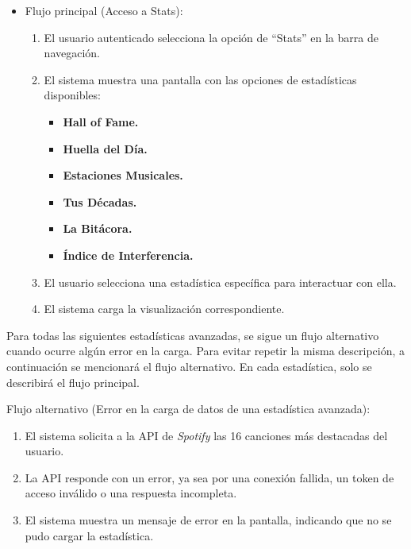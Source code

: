 \begin{itemize}
    \item Flujo principal (Acceso a Stats):
          \begin{enumerate}
              \item El usuario autenticado selecciona la opción de ``Stats'' en la barra de navegación.
              \item El sistema muestra una pantalla con las opciones de estadísticas disponibles:
                    \begin{itemize}
                        \item \textbf{Hall of Fame.}
                        \item \textbf{Huella del Día.}
                        \item \textbf{Estaciones Musicales.}
                        \item \textbf{Tus Décadas.}
                        \item \textbf{La Bitácora.}
                        \item \textbf{Índice de Interferencia.}
                    \end{itemize}
              \item El usuario selecciona una estadística específica para interactuar con ella.
              \item El sistema carga la visualización correspondiente.
          \end{enumerate}
\end{itemize}

Para todas las siguientes estadísticas avanzadas, se sigue un flujo alternativo cuando ocurre algún error en la carga. Para evitar repetir la misma descripción, a continuación se mencionará el flujo alternativo. En cada estadística, solo se describirá el flujo principal.

Flujo alternativo (Error en la carga de datos de una estadística avanzada):
\begin{enumerate}
    \item El sistema solicita a la API de \textit{Spotify} las 16 canciones más destacadas del usuario.
    \item La API responde con un error, ya sea por una conexión fallida, un token de acceso inválido o una respuesta incompleta.
    \item El sistema muestra un mensaje de error en la pantalla, indicando que no se pudo cargar la estadística.
\end{enumerate}



